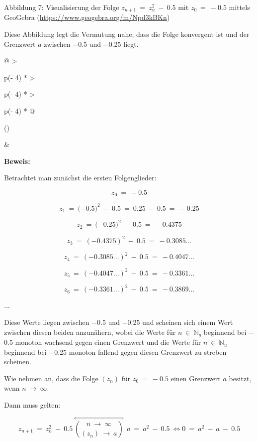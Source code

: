 \documentclass[a4paper, 12pt]{book}
\begin{document}
\protect\hypertarget{_Toc167901657}{}{}Abbildung 7: Visualisierung der
Folge \(z_{n + 1}\  = \ z_{n}^{2}\  - \ 0.5\) mit \(z_{0}\  = \  - 0.5\)
mittels GeoGebra (\url{https://www.geogebra.org/m/Npd3kBKn})

Diese Abbildung legt die Vermutung nahe, dass die Folge konvergent ist
und der Grenzwert \(a\) zwischen \(-\)0.5 und \(-\)0.25 liegt.

\begin{longtable}[]{@{}
  >{\raggedright\arraybackslash}p{(\columnwidth - 4\tabcolsep) * }
  >{\raggedright\arraybackslash}p{(\columnwidth - 4\tabcolsep) * }
  >{\raggedright\arraybackslash}p{(\columnwidth - 4\tabcolsep) * }@{}}
\toprule()
\begin{minipage}[b]{\linewidth}\raggedright
\end{minipage} & \begin{minipage}[b]{\linewidth}\raggedright
\textbf{Beweis:}

Betrachtet man zunächst die ersten Folgenglieder:

\[z_{0}\  = \  - 0.5\]

\[z_{1}\  = \ ( - {0.5)}^{2}\  - \ 0.5\  = \ 0.25\  - \ 0.5\  = \  - 0.25\]

\[z_{2}\  = \ ( - {0.25)}^{2}\  - \ 0.5\  = \  - 0.4375\]

\[z_{3}\  = \ {( - 0.4375)}^{2}\  - \ 0.5\  = \  - 0.3085...\]

\[z_{4}\  = \ {( - 0.3085...)}^{2}\  - \ 0.5\  = \  - 0.4047...\]

\[z_{5}\  = \ {( - 0.4047...)}^{2}\  - \ 0.5\  = \  - 0.3361...\]

\[z_{6}\  = \ {( - 0.3361...)}^{2}\  - \ 0.5\  = \  - 0.3869...\]

...

Diese Werte liegen zwischen \(-\)0.5 und \(-\)0.25 und scheinen sich
einem Wert zwischen diesen beiden anzunähern, wobei die Werte für
\(n\  \in \ \mathbb{N}_{g}\) beginnend bei \(-\)0.5 monoton wachsend
gegen einen Grenzwert und die Werte für \(n\  \in \ \mathbb{N}_{u}\)
beginnend bei \(-\)0.25 monoton fallend gegen diesen Grenzwert zu
streben scheinen.

Wie nehmen an, dass die Folge \(\left( z_{n} \right)\) für
\(z_{0}\  = \  - 0.5\) einen Grenzwert \(a\) besitzt, wenn
\(n\  \rightarrow \ \infty\).

Dann muss gelten:

\[z_{n + 1}\  = \ z_{n}^{2}\  - \ 0.5\ \overset{\Leftrightarrow}{\binom{n\  \rightarrow \ \infty}{\left( z_{n} \right)\  \rightarrow \ a}}\ \ a\  = \ a^{2}\  - \ 0.5\  \Longleftrightarrow 0\  = \ a^{2}\  - \ a\  - \ 0.5\]


\end{minipage}
\end{longtable}
\end{document}
